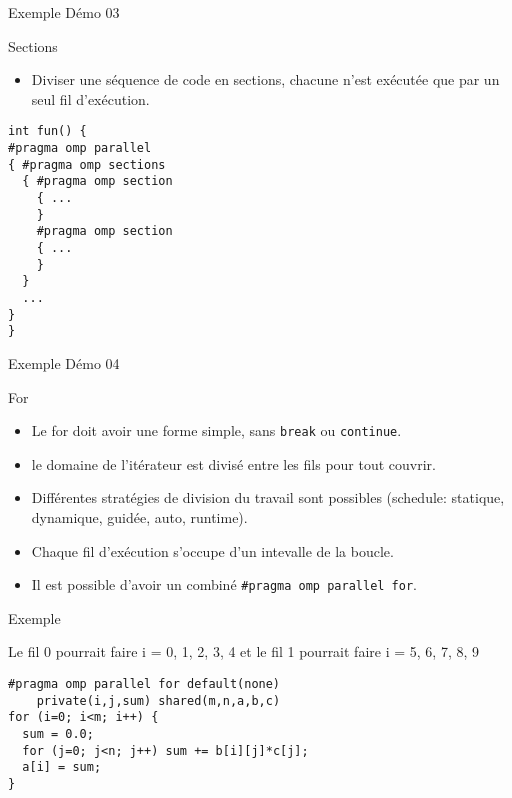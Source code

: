 \documentclass[10pt]{beamer}
\begin{document}
\begin{frame}[fragile]{Exemple}
Démo 03
\end{frame}

\begin{frame}{Sections}

  \begin{itemize}
    \item Diviser une séquence de code en sections, chacune n'est exécutée que par un seul fil d'exécution.
  \end{itemize}
  \begin{verbatim}
int fun() {
#pragma omp parallel
{ #pragma omp sections
  { #pragma omp section
    { ...
    }
    #pragma omp section
    { ...
    }
  }
  ...
}
}
  \end{verbatim}
\end{frame}

\begin{frame}[fragile]{Exemple}
Démo 04
\end{frame}

\begin{frame}[fragile]{For}

  \begin{itemize}
    \item Le for doit avoir une forme simple, sans \texttt{break} ou \texttt{continue}.

    \item le domaine de l'itérateur est divisé entre les fils pour tout couvrir.

    \item Différentes stratégies de division du travail sont possibles (schedule: statique, dynamique, guidée, auto, runtime).

    \item Chaque fil d'exécution s'occupe d'un intevalle de la boucle.

    \item Il est possible d'avoir un combiné \verb|#pragma omp parallel for|.
  \end{itemize}
\end{frame}

\begin{frame}[fragile]{Exemple}

Le fil 0 pourrait faire i = 0, 1, 2, 3, 4 et le fil 1 pourrait faire i = 5, 6, 7, 8, 9
  \begin{verbatim}
#pragma omp parallel for default(none) 
    private(i,j,sum) shared(m,n,a,b,c)
for (i=0; i<m; i++) {
  sum = 0.0;
  for (j=0; j<n; j++) sum += b[i][j]*c[j];
  a[i] = sum;
}
  \end{verbatim}
\end{frame}
\end{document}
